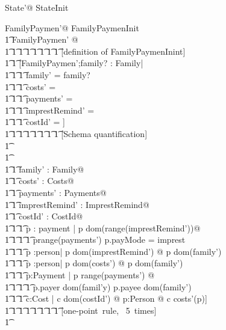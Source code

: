 \documentclass{article}
\begin{document}
\begin{zed}
\exists State'@ StateInit
\end{zed}

\begin{zed}
\exists FamilyPaymen'@ FamilyPaymenInit\\
\t1 \iff \exists FamilyPaymen' @\\
\t1 \t1 \t1 \t1 \t1 \t1 \t1  \t1 [definition of FamilyPaymenInint]\\
\t1 \t1 [FamilyPaymen';family? : Family|\\
\t1 \t1 \t1 family' = family? \land \\
\t1 \t1 \t1 costs' = \emptyset \land \\
\t1 \t1 \t1 payments' = \emptyset \land\\
\t1 \t1 \t1 imprestRemind' = \emptyset\\
\t1 \t1 \t1 costId' = \emptyset]\\
\t1 \t1 \t1 \t1 \t1 \t1 \t1  \t1 [Schema quantification]\\
\t1 \iff [family? : Family |\\
\t1 \t1 \exists FamilyPaymen'@\\
\t1 \t1 \t1 family' = family? \land \\
\t1 \t1 \t1 costs' = \emptyset \land \\
\t1 \t1 \t1 payments' = \emptyset \land\\
\t1 \t1 \t1 imprestRemind' = \emptyset\\
\t1 \t1 \t1 costId' = \emptyset]\\
\t1 \iff [family? : Family |\\
\t1 \t1 \t1 \t1 \t1 \t1 \t1  \t1 [definition of FamilyPayment']\\
\t1 \t1 \exists family' : Family@\\
\t1 \t1 \exists costs' : Costs@\\
\t1 \t1 \exists payments' : Payments@\\
\t1 \t1 \exists imprestRemind' : ImprestRemind@\\
\t1 \t1 \exists costId' : CostId@\\
\t1 \t1 \t1 \forall p : payment | p \in dom(range(imprestRemind'))@\\
\t1 \t1 \t1 \t1 p\in range(payments') \land p.payMode = imprest \land \\
\t1 \t1 \t1 \forall p :person| p \in dom(imprestRemind') @ p \in dom(family') \land\\
\t1 \t1 \t1 \forall p :person| p \in dom(costs') @ p \in dom(family') \land\\
\t1 \t1 \t1 \forall p:Payment | p \in range(payments') @ \\
\t1 \t1 \t1 \t1 p.payer \in dom(famil'y) \land p.payee \in dom(family')\\
\t1 \t1 \t1 \forall c:Cost | c \in dom(costId') @ \exists p:Person @ c \in costs'(p)]\\
\t1 \t1 \t1 \t1 \t1 \t1 \t1  \t1 [one-point~rule,~ 5~times]\\
\t1 

\end{zed}
\end{document}

